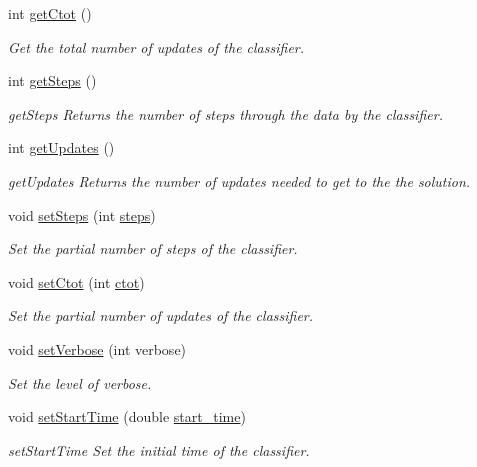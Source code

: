 \begin{DoxyCompactItemize}
int \hyperlink{class_classifier_ab80a78cd6a4efc59b16f5b80cd64dc63}{get\+Ctot} ()
\begin{DoxyCompactList}\small\item\em Get the total number of updates of the classifier. \end{DoxyCompactList}\item 
int \hyperlink{class_classifier_a1fb3e4dfd80c154e89603c8fa1b11b76}{get\+Steps} ()
\begin{DoxyCompactList}\small\item\em get\+Steps Returns the number of steps through the data by the classifier. \end{DoxyCompactList}\item 
int \hyperlink{class_classifier_a738c2fbed982db6cad02062edcc037e4}{get\+Updates} ()
\begin{DoxyCompactList}\small\item\em get\+Updates Returns the number of updates needed to get to the the solution. \end{DoxyCompactList}\item 
void \hyperlink{class_classifier_a779b6cac0351e272ee0573d919d5d060}{set\+Steps} (int \hyperlink{class_classifier_a1e4c9c9ba059d5aff1d4d81eb41725cb}{steps})
\begin{DoxyCompactList}\small\item\em Set the partial number of steps of the classifier. \end{DoxyCompactList}\item 
void \hyperlink{class_classifier_a3293d7d39c3934503a23b920f84f73e7}{set\+Ctot} (int \hyperlink{class_classifier_a99d9a7f504212bb3dc2726c10a2333c6}{ctot})
\begin{DoxyCompactList}\small\item\em Set the partial number of updates of the classifier. \end{DoxyCompactList}\item 
void \hyperlink{class_classifier_a073b94029512378ccfae3aa34aae0212}{set\+Verbose} (int verbose)
\begin{DoxyCompactList}\small\item\em Set the level of verbose. \end{DoxyCompactList}\item 
void \hyperlink{class_classifier_a7f1cf3ac53b0593307a050368a912bb4}{set\+Start\+Time} (double \hyperlink{class_classifier_a4488a20bd7b4fc22d57244aaee57b002}{start\+\_\+time})
\begin{DoxyCompactList}\small\item\em set\+Start\+Time Set the initial time of the classifier. \end{DoxyCompactList}\item 

\end{DoxyCompactItemize}
